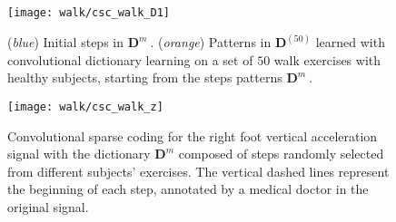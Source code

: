 \documentclass[../thesis.tex]{subfiles}
\begin{document}
\begin{figure}[tp]
	\centering
	\texttt{[image: walk/csc\_walk\_D1]}
	\caption{(\emph{blue}) Initial steps in $\pmb D^{m}~.$ (\emph{orange}) Patterns in
			 $\pmb D^{(50)}$ learned with convolutional dictionary learning on a set of $50$
			 walk exercises with healthy subjects, starting from the steps patterns
			 $\pmb D^{m}~.$}
	\label{fig:walk:dict_tweak}
\end{figure}

	
\begin{figure}[tp]
	\centering
	\texttt{[image: walk/csc\_walk\_z]}
	\caption{Convolutional sparse coding for the right foot vertical acceleration signal with
			 the dictionary $\pmb D^{m}$ composed of steps randomly selected from different subjects'
			 exercises. The vertical dashed lines represent the beginning of each step,
			 annotated by a medical doctor in the original signal.}
	\label{fig:walk:encode_steps}
\end{figure}
\end{document}
